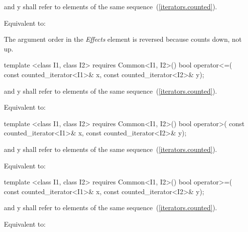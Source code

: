 \begin{itemdescr}
\pnum
\requires {} and {y} shall refer to
elements of the same sequence~(\ref{iterators.counted}).

\pnum
\effects Equivalent to:

\pnum
\enternote The argument order in the \textit{Effects} element is reversed because 
counts down, not up. \exitnote

\end{itemdescr}

%
%
\begin{itemdecl}
template <class I1, class I2>
    requires Common<I1, I2>()
  bool operator<=(
    const counted_iterator<I1>& x, const counted_iterator<I2>& y);
\end{itemdecl}

\begin{itemdescr}
\pnum
\requires {} and {y} shall refer to
elements of the same sequence~(\ref{iterators.counted}).

\pnum
\effects Equivalent to:
\end{itemdescr}

%
%
\begin{itemdecl}
template <class I1, class I2>
    requires Common<I1, I2>()
  bool operator>(
    const counted_iterator<I1>& x, const counted_iterator<I2>& y);
\end{itemdecl}

\begin{itemdescr}
\pnum
\requires {} and {y} shall refer to
elements of the same sequence~(\ref{iterators.counted}).

\pnum
\effects Equivalent to:
\end{itemdescr}

%
%
\begin{itemdecl}
template <class I1, class I2>
    requires Common<I1, I2>()
  bool operator>=(
    const counted_iterator<I1>& x, const counted_iterator<I2>& y);
\end{itemdecl}

\begin{itemdescr}
\pnum
\requires {} and {y} shall refer to
elements of the same sequence~(\ref{iterators.counted}).

\pnum
\effects Equivalent to:
\end{itemdescr}


